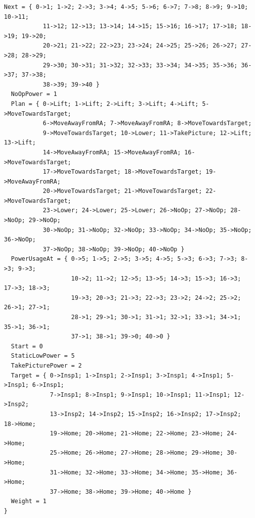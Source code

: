 \documentclass[12pt]{extarticle}
\begin{document}
\begin{lstlisting}[basicstyle=\tiny]
  Next = { 0->1; 1->2; 2->3; 3->4; 4->5; 5->6; 6->7; 7->8; 8->9; 9->10; 10->11;
           11->12; 12->13; 13->14; 14->15; 15->16; 16->17; 17->18; 18->19; 19->20;
           20->21; 21->22; 22->23; 23->24; 24->25; 25->26; 26->27; 27->28; 28->29;
           29->30; 30->31; 31->32; 32->33; 33->34; 34->35; 35->36; 36->37; 37->38;
           38->39; 39->40 }
  NoOpPower = 1
  Plan = { 0->Lift; 1->Lift; 2->Lift; 3->Lift; 4->Lift; 5->MoveTowardsTarget;
           6->MoveAwayFromRA; 7->MoveAwayFromRA; 8->MoveTowardsTarget;
           9->MoveTowardsTarget; 10->Lower; 11->TakePicture; 12->Lift; 13->Lift;
           14->MoveAwayFromRA; 15->MoveAwayFromRA; 16->MoveTowardsTarget;
           17->MoveTowardsTarget; 18->MoveTowardsTarget; 19->MoveAwayFromRA;
           20->MoveTowardsTarget; 21->MoveTowardsTarget; 22->MoveTowardsTarget;
           23->Lower; 24->Lower; 25->Lower; 26->NoOp; 27->NoOp; 28->NoOp; 29->NoOp;
           30->NoOp; 31->NoOp; 32->NoOp; 33->NoOp; 34->NoOp; 35->NoOp; 36->NoOp;
           37->NoOp; 38->NoOp; 39->NoOp; 40->NoOp }
  PowerUsageAt = { 0->5; 1->5; 2->5; 3->5; 4->5; 5->3; 6->3; 7->3; 8->3; 9->3;
                   10->2; 11->2; 12->5; 13->5; 14->3; 15->3; 16->3; 17->3; 18->3;
                   19->3; 20->3; 21->3; 22->3; 23->2; 24->2; 25->2; 26->1; 27->1;
                   28->1; 29->1; 30->1; 31->1; 32->1; 33->1; 34->1; 35->1; 36->1;
                   37->1; 38->1; 39->0; 40->0 }
  Start = 0
  StaticLowPower = 5
  TakePicturePower = 2
  Target = { 0->Insp1; 1->Insp1; 2->Insp1; 3->Insp1; 4->Insp1; 5->Insp1; 6->Insp1;
             7->Insp1; 8->Insp1; 9->Insp1; 10->Insp1; 11->Insp1; 12->Insp2;
             13->Insp2; 14->Insp2; 15->Insp2; 16->Insp2; 17->Insp2; 18->Home;
             19->Home; 20->Home; 21->Home; 22->Home; 23->Home; 24->Home;
             25->Home; 26->Home; 27->Home; 28->Home; 29->Home; 30->Home;
             31->Home; 32->Home; 33->Home; 34->Home; 35->Home; 36->Home;
             37->Home; 38->Home; 39->Home; 40->Home }
  Weight = 1
}
\end{lstlisting}

\vspace{10mm}
\end{document}

